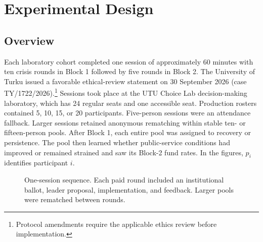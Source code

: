\documentclass[11pt]{article}
\begin{document}
\section{Experimental Design}

\subsection{Overview}

Each laboratory cohort completed one session of approximately 60 minutes with ten crisis rounds in Block 1 followed by five rounds in Block 2. The University of Turku issued a favorable ethical-review statement on 30 September 2026 (case TY/1722/2026).\footnote{Protocol amendments require the applicable ethics review before implementation.} Sessions took place at the UTU Choice Lab decision-making laboratory, which has 24 regular seats and one accessible seat. Production rosters contained 5, 10, 15, or 20 participants. Five-person sessions were an attendance fallback. Larger sessions retained anonymous rematching within stable ten- or fifteen-person pools. After Block 1, each entire pool was assigned to recovery or persistence. The pool then learned whether public-service conditions had improved or remained strained and saw its Block-2 fund rates. In the figures, \(p_i\) identifies participant \(i\).

\begin{figure}[H]
\centering
{}
\caption{One-session sequence. Each paid round included an institutional ballot, leader proposal, implementation, and feedback. Larger pools were rematched between rounds.}
\label{fig:design}
\end{figure}
\end{document}
